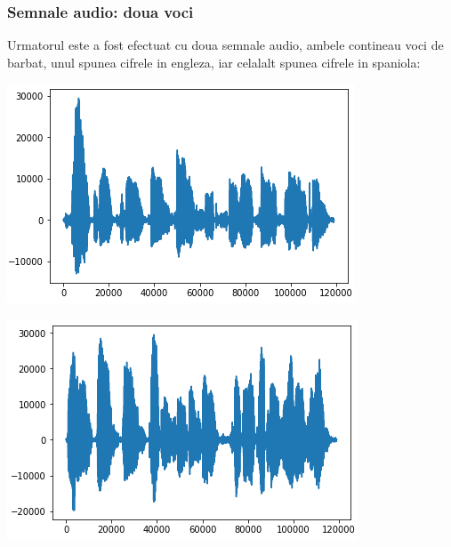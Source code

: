 \documentclass[12pt]{article}
\begin{document}
 \subsubsection{Semnale audio: doua voci}
 Urmatorul este a fost efectuat cu doua semnale audio, ambele contineau voci de barbat, unul spunea cifrele in engleza, iar celalalt spunea cifrele in spaniola:
\begin{center}
	\includegraphics[scale=1]{english_speech}
\end{center}
\begin{center}
	\includegraphics[scale=1]{spanish_speech}
\end{center}
 
\end{document}
